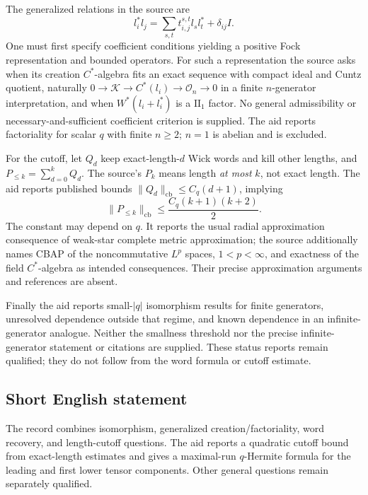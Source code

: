 \documentclass[11pt]{article}
\begin{document}
The generalized relations in the source are
\[
 l_i^*l_j=\sum_{s,t}t_{i,j}^{s,t}l_sl_t^*+\delta_{ij}I.
\]
One must first specify coefficient conditions yielding a positive Fock representation and bounded operators. For such a representation the source asks when its creation \(C^*\)-algebra fits an exact sequence with compact ideal and Cuntz quotient, naturally \(0\to\mathcal K\to C^*(l_i)\to\mathcal O_n\to0\) in a finite \(n\)-generator interpretation, and when \(W^*(l_i+l_i^*)\) is a \(\mathrm{II}_1\) factor. No general admissibility or necessary-and-sufficient coefficient criterion is supplied. The aid reports factoriality for scalar \(q\) with finite \(n\ge2\); \(n=1\) is abelian and is excluded.

For the cutoff, let \(Q_d\) keep exact-length-\(d\) Wick words and kill other lengths, and \(P_{\le k}=\sum_{d=0}^kQ_d\). The source's \(P_k\) means length \emph{at most} \(k\), not exact length. The aid reports published bounds \(\|Q_d\|_{\mathrm{cb}}\le C_q(d+1)\), implying
\[
 \|P_{\le k}\|_{\mathrm{cb}}\le\frac{C_q(k+1)(k+2)}2.
\]
The constant may depend on \(q\). It reports the usual radial approximation consequence of weak-star complete metric approximation; the source additionally names CBAP of the noncommutative \(L^p\) spaces, \(1<p<\infty\), and exactness of the field \(C^*\)-algebra as intended consequences. Their precise approximation arguments and references are absent.

Finally the aid reports small-\(|q|\) isomorphism results for finite generators, unresolved dependence outside that regime, and known dependence in an infinite-generator analogue. Neither the smallness threshold nor the precise infinite-generator statement or citations are supplied. These status reports remain qualified; they do not follow from the word formula or cutoff estimate.
\subsection{Short English statement}
The record combines isomorphism, generalized creation/factoriality, word recovery, and length-cutoff questions. The aid reports a quadratic cutoff bound from exact-length estimates and gives a maximal-run \(q\)-Hermite formula for the leading and first lower tensor components. Other general questions remain separately qualified.
\end{document}

